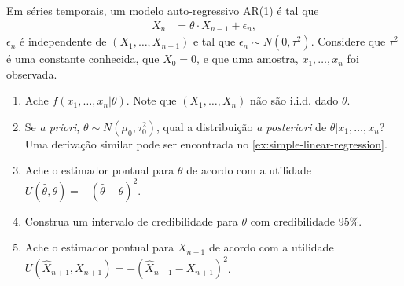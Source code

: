 \begin{exercise}
 \label{ex:ar-1}
 Em séries temporais, 
 um modelo auto-regressivo AR(1) é tal que
 \begin{align*}
  X_{n}	&= \theta \cdot X_{n-1} + \epsilon_{n},
 \end{align*}
 $\epsilon_{n}$ é independente de $(X_{1},\ldots,X_{n-1})$ 
 e tal que  $\epsilon_{n} \sim N(0,\tau^{2})$.
 Considere que $\tau^{2}$ é uma constante conhecida, 
 que $X_{0}=0$, e que uma amostra, 
 $x_{1},\ldots,x_{n}$ foi observada.
 \begin{enumerate}[label=(\alph*)]
  \item Ache $f(x_{1},\ldots,x_{n}|\theta)$. Note que   
  $(X_{1},\ldots,X_{n})$ não são i.i.d. dado $\theta$.
  \item Se \emph{a priori}, $\theta \sim N(\mu_{0},\tau_{0}^{2})$, 
  qual a distribuição \emph{a posteriori} de
  $\theta|x_{1},\ldots,x_{n}$?
  Uma derivação similar pode ser encontrada no 
  \cref{ex:simple-linear-regression}.
  \item Ache o estimador pontual para $\theta$ 
  de acordo com a utilidade 
  $U(\hat{\theta},\theta) = -(\hat{\theta}-\theta)^{2}$.
  \item Construa um intervalo de credibilidade para
  $\theta$ com credibilidade 95\%.
  \item Ache o estimador pontual para $X_{n+1}$ 
  de acordo com  a utilidade 
  $U(\hat{X}_{n+1},X_{n+1}) = -(\hat{X}_{n+1}-X_{n+1})^{2}$.
 \end{enumerate}
\end{exercise}

